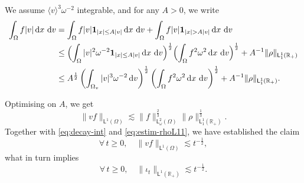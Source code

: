 \documentclass[11pt]{amsart}
\theoremstyle{definition}
\theoremstyle{remark}
\numberwithin{equation}{section}
\newcommand\R{{\mathbb R}}
\newcommand{\dd}{{\, \mathrm d}}
\newcommand{\sfL}{\mathsf{L}}
\begin{document}
We assume $\langle v \rangle^3 \omega^{-2}$ integrable,  and for any $A > 0$, we write 
\begin{align*}
\int_\Omega f |v| \dd x \, \dd v
  &= \int_\Omega f |v| {\bf 1}_{|x| \le A |v|} \dd x \, \dd v  +  \int_\Omega f |v| {\bf 1}_{|x| > A |v|} \dd x \, \dd v 
  \\
    &\le \Bigl( \int_\Omega |v|^2  \omega^{-2} {\bf 1}_{|x| \le A |v|} \dd x \, \dd v \Bigr)^{\frac{1}{2}}  \Bigl( \int_\Omega f^2 \omega^2 \dd x \, \dd v \Bigr)^{\frac{1}{2}}    + A^{-1}  \| \rho \|_{\sfL^{1}_1(\R_+)} 
  \\
    &\le A^{\frac{1}{2}} \left( \int_{\Omega_v} |v|^3  \omega^{-2} \dd v \right)^{\frac{1}{2}}  \left( \int_\Omega f^2 \omega^2 \dd x \, \dd v \right)^{\frac{1}{2}}    + A^{-1}  \| \rho \|_{\sfL^{1}_1(\R_+)}.    
\end{align*}

Optimising on $A$, we  get 
\begin{equation*}
  \| v f  \|_{\sfL^{1}(\Omega)}  \lesssim \| f \|_{\sfL_\omega^{2}(\Omega)} ^{\frac23} \| \rho \|_{\sfL^{1}_1(\R_+)} ^{\frac13}.
\end{equation*}
Together with \eqref{eq:decay-int} and \eqref{eq:estim-rhoL11}, we have established  the claim
\begin{equation}
  \label{eq:1stmoment-L1decay-kinetic}
  \forall \, t \ge 0, \quad  \| v f  \|_{\sfL^{1}(\Omega)} \lesssim  t^{-\frac12}, 
\end{equation}
what in turn implies 
\begin{equation}
  \label{eq:j-L1decay-kinetic}
  \forall \, t \ge 0, \quad \| \iota_t \|_{\sfL^{1}(\R_+)} \lesssim  t^{-\frac12}.
\end{equation}
\end{document}
